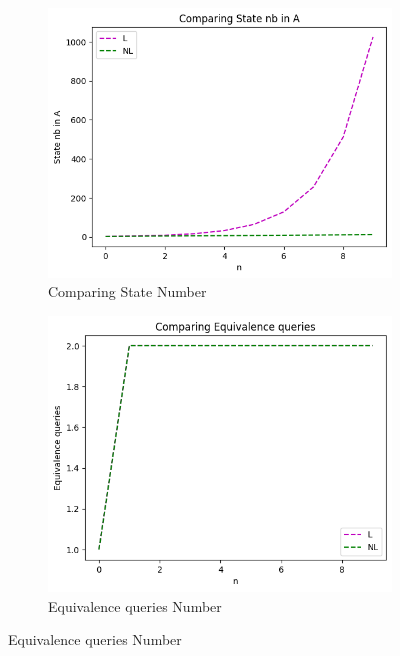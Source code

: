 \begin{figure}[!htb]
  \centering
  \begin{subfigure}[b]{0.3\textwidth}
    \includegraphics[width=\textwidth]{../statistics/plots/wrostDFA/State nb in A.png}
    \caption{Comparing State Number}
    \label{fig:StateWrostDFACompare}
  \end{subfigure}
  \begin{subfigure}[b]{0.3\textwidth}
    \includegraphics[width=\textwidth]{../statistics/plots/wrostDFA/Equivalence queries.png}
    \caption{Equivalence queries Number}
    \label{fig:EquivWrostDFACompare}
  \end{subfigure}

\end{figure}
